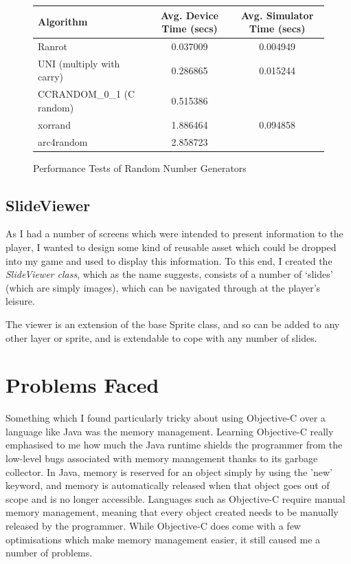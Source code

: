 \documentclass[a4paper,oneside]{report}
\begin{document}
\begin{figure}[h!]
  \centering	
	\begin{tabular}{|l|c|c|}
		\hline
		Algorithm & Avg. Device Time (secs) & Avg. Simulator Time (secs) \\ \hline
		Ranrot & 0.037009 & 0.004949 \\ \hline
		UNI (multiply with carry) & 0.286865 & 0.015244 \\ \hline
		CCRANDOM\_0\_1 (C random) & 0.515386 &  \\ \hline
		xorrand & 1.886464 & 0.094858 \\ \hline
		arc4random & 2.858723 &  \\ \hline
	\end{tabular}    
	\caption{Performance Tests of Random Number Generators}
	\label{fig:RNGTests}
\end{figure}

\subsection{SlideViewer}

As I had a number of screens which were intended to present information to the player, I wanted to design some kind of reusable asset which could be dropped into my game and used to display this information. To this end, I created the \emph{SlideViewer class}, which as the name suggests, consists of a number of `slides' (which are simply images), which can be navigated through at the player's leisure.

The viewer is an extension of the base Sprite class, and so can be added to any other layer or sprite, and is extendable to cope with any number of slides.
		
\section{Problems Faced} 

Something which I found particularly tricky about using Objective-C over a language like Java was the memory management. Learning Objective-C really emphasised to me how much the Java runtime shields the programmer from the low-level bugs associated with memory management thanks to its garbage collector. In Java, memory is reserved for an object simply by using the 'new' keyword, and memory is automatically released when that object goes out of scope and is no longer accessible. Languages such as Objective-C  require manual memory management, meaning that every object created needs to be manually released by the programmer. While Objective-C does come with a few optimisations which make memory management easier, it still caused me a number of problems. 
\end{document}
